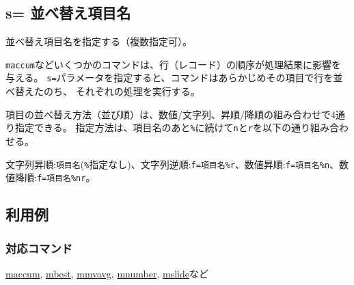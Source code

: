 
%

\subsection{s= 並べ替え項目名\label{sect:option_s}}

並べ替え項目名を指定する（複数指定可）。

\verb|maccum|などいくつかのコマンドは、行（レコード）の順序が処理結果に影響を与える。
\verb|s=|パラメータを指定すると、コマンドはあらかじめその項目で行を並べ替えたのち、
それぞれの処理を実行する。

項目の並べ替え方法（並び順）は、数値/文字列、昇順/降順の組み合わせで4通り指定できる。
指定方法は、項目名のあと\verb|%|に続けて\verb|n|と\verb|r|を以下の通り組み合わせる。

文字列昇順:\verb|項目名|(\verb|%|指定なし)、文字列逆順:\verb|f=項目名%r|、数値昇順:\verb|f=項目名%n|、数値降順:\verb|f=項目名%nr|。

\subsection*{利用例}


\subsubsection*{対応コマンド}
\hyperref[sect:maccum]{maccum},
\hyperref[sect:mbest]{mbest},
\hyperref[sect:mmvavg]{mmvavg},
\hyperref[sect:mnumber]{mnumber},
\hyperref[sect:mslide]{mslide}など

%

